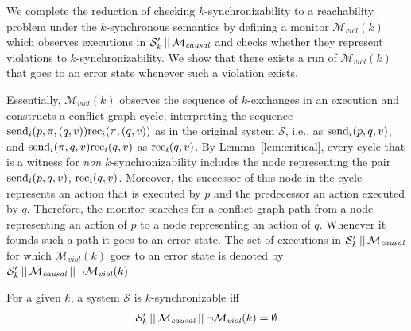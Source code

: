 We complete the reduction of checking $k$-synchronizability to a reachability problem under the $k$-synchronous semantics by defining a monitor $\mathcal{M}_{\mathit{viol}}(k)$ which observes executions in $\mathcal{S}_k' \,||\,\mathcal{M}_{\mathit{causal}}$ and checks whether they represent violations to $k$-synchronizability. We show that there exists a run of $\mathcal{M}_{\mathit{viol}}(k)$ that goes to an error state whenever such a violation exists. 

Essentially, $\mathcal{M}_{\mathit{viol}}(k)$ observes the sequence of $k$-exchanges in an execution and constructs a conflict graph cycle, interpreting the sequence $\mathrm{send}_{i}({p,\pi,(q,v)})\mathrm{rec}_{i}({\pi,(q,v)})$ as in the original system $\mathcal{S}$, i.e., as $\mathrm{send}_{i}({p,q,v})$, and $\mathrm{send}_{i}({\pi,q,v})\mathrm{rec}_{i}({q,v})$ as $\mathrm{rec}_{i}({q,v})$. 
By Lemma~\ref{lem:critical}, every cycle that is a witness for \emph{non} $k$-synchronizability includes the node representing the pair $\mathrm{send}_{i}({p,q,v})$, $\mathrm{rec}_{i}({q,v})$. Moreover, the successor of this node in the cycle represents an action that is executed by $p$ and the predecessor an action executed by $q$. Therefore, the monitor searches for a conflict-graph path from a node representing an action of $p$ to a node representing an action of $q$. Whenever it founds such a path it goes to an error state.
The set of executions in $\mathcal{S}_k' \,||\,\mathcal{M}_{\mathit{causal}}$ for which $\mathcal{M}_{\mathit{viol}}(k)$ goes to an error state %
is denoted by $\mathcal{S}_k' \,||\,\mathcal{M}_{\mathit{causal}}\,||\, \neg \mathcal{M}_{\mathit{viol}}(k)$.

\begin{theorem}\label{th:main-verif}
For a given $k$, a system $\mathcal{S}$ is $k$-synchronizable iff 
\begin{align*}
\mathcal{S}_k' \,||\,\mathcal{M}_{\mathit{causal}}\,||\, \neg \mathcal{M}_{\mathit{viol}}(k)=\emptyset
\end{align*}
\end{theorem}








